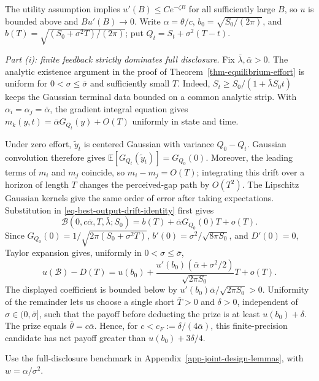 \documentclass[mnsc]{informs3}
\begin{document}
\begin{APPENDICES}
{
The utility assumption implies $u'(B)\leq C e^{-\zeta B}$ for all sufficiently
large $B$, so $u$ is bounded above and $Bu'(B)\to0$.
Write $\alpha=\theta/c$, $b_0=\sqrt{S_0/(2\pi)}$, and
$b(T)=\sqrt{(S_0+\sigma^2T)/(2\pi)}$; put
$Q_t=S_t+\sigma^2(T-t)$.

\emph{Part (i): finite feedback strictly dominates full disclosure.}
Fix $\bar\lambda,\bar\alpha>0$. The analytic existence argument in the
proof of Theorem~\ref{thm-equilibrium-effort} is uniform for
$0<\sigma\leq\bar\sigma$ and sufficiently small $T$.
Indeed, $S_t\geq S_0/(1+\bar\lambda S_0t)$ keeps the Gaussian terminal
data bounded on a common analytic strip. With $\alpha_i=\alpha_j=\bar\alpha$,
the gradient integral equation gives
$m_k(y,t)=\bar\alpha G_{Q_t}(y)+O(T)$ uniformly in state and time.

Under zero effort, $\tilde y_t$ is centered Gaussian with variance
$Q_0-Q_t$. Gaussian convolution therefore gives
$\mathbb E[G_{Q_t}(\tilde y_t)]=G_{Q_0}(0)$. Moreover, the leading terms
of $m_i$ and $m_j$ coincide, so $m_i-m_j=O(T)$; integrating this drift
over a horizon of length $T$ changes the perceived-gap path by $O(T^2)$.
The Lipschitz Gaussian kernels give the same order of error after taking
expectations. Substitution in \eqref{eq-best-output-drift-identity} first
gives
\[
\mathcal B(0,c\bar\alpha,T,\bar\lambda;S_0)
=b(T)+\bar\alpha G_{Q_0}(0)T+o(T).
\]
Since $G_{Q_0}(0)=1/\sqrt{2\pi(S_0+\sigma^2T)}$,
$b'(0)=\sigma^2/\sqrt{8\pi S_0}$, and $D'(0)=0$, Taylor expansion gives,
uniformly in $0<\sigma\leq\bar\sigma$,
\[
u(\mathcal B)-D(T)
=u(b_0)+
\frac{u'(b_0)(\bar\alpha+\sigma^2/2)}{\sqrt{2\pi S_0}}T+o(T).
\]
The displayed coefficient is bounded below by
$u'(b_0)\bar\alpha/\sqrt{2\pi S_0}>0$. Uniformity of the remainder lets
us choose a single short $\bar T>0$ and $\delta>0$, independent of
$\sigma\in(0,\bar\sigma]$, such that the payoff before deducting the prize
is at least $u(b_0)+\delta$. The prize equals
$\bar\theta=c\bar\alpha$. Hence, for
$c<c_F:=\delta/(4\bar\alpha)$, this finite-precision candidate has net
payoff greater than $u(b_0)+3\delta/4$.

Use the full-disclosure benchmark in Appendix~\ref{app-joint-design-lemmas},
with $w=\alpha/\sigma^2$.

}
\end{APPENDICES}
\end{document}
